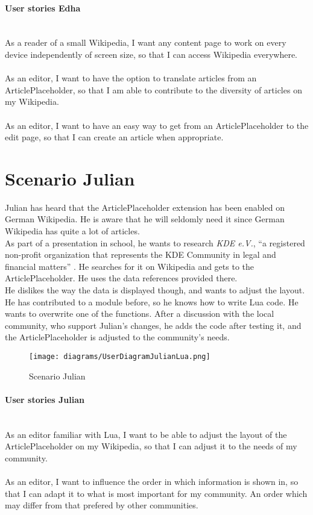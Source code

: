 \paragraph{User stories Edha} ~\\
As a reader of a small Wikipedia, I want any content page to work on every device independently of screen size, so that I can access Wikipedia everywhere. \\
\\
As an editor, I want to have the option to translate articles from an ArticlePlaceholder, so that I am able to contribute to the diversity of articles on my Wikipedia. \\
\\
As an editor, I want to have an easy way to get from an ArticlePlaceholder to the edit page, so that I can create an article when appropriate. 

\section{Scenario Julian}
Julian has heard that the ArticlePlaceholder extension has been enabled on German Wikipedia. He is aware that he will seldomly need it since German Wikipedia has quite a lot of articles. \\
As part of a presentation in school, he wants to research \textit{KDE e.V.}, ``a registered non-profit organization that represents the KDE Community in legal and financial matters'' \citep{kdeev}. He searches for it on Wikipedia and gets to the ArticlePlaceholder. He uses the data references provided there. \\
He dislikes the way the data is displayed though, and wants to adjust the layout. He has contributed to a module before, so he knows how to write Lua code. He wants to overwrite one of the functions. After a discussion with the local community, who support Julian's changes, he adds the code after testing it, and the ArticlePlaceholder is adjusted to the community's needs.

\begin{figure}[H]
	\centering
	\texttt{[image: diagrams/UserDiagramJulianLua.png]}
	\caption{Scenario Julian}
	\label{fig:ScenarioJulian}
\end{figure}

\paragraph{User stories Julian} ~\\
As an editor familiar with Lua, I want to be able to adjust the layout of the ArticlePlaceholder on my Wikipedia, so that I can adjust it to the needs of my community. \\
\\
As an editor, I want to influence the order in which information is shown in, so that I can adapt it to what is most important for my community. An order which may differ from that prefered by other communities.

